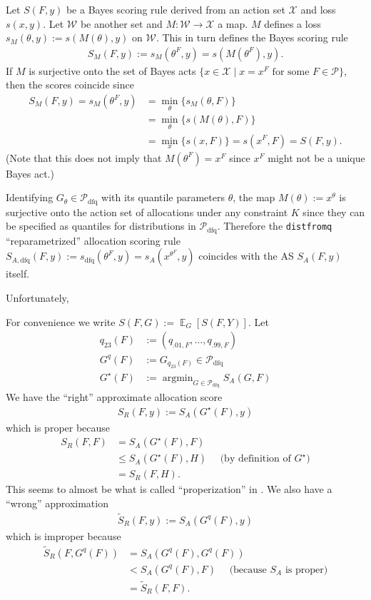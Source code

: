 \documentclass{article}
\DeclareMathOperator*{\argmin}{argmin}
\DeclareMathOperator{\Ex}{\mathbb{E}}
\begin{document}
Let $S(F,y)$ be a Bayes scoring rule derived from an action set $\mathcal{X}$ and loss $s(x,y)$.
Let $\mathcal{W}$ be another set and $M:\mathcal{W} \to \mathcal{X}$ a map. $M$ defines a loss $s_M(\theta, y):= s(M(\theta), y)$
on $\mathcal{W}$. This in turn defines the Bayes scoring rule
\begin{align}
S_M(F,y) := s_M(\theta^F,y) = s(M(\theta^F),y).
\end{align}
If $M$ is surjective onto the set of Bayes acts $\{x \in \mathcal{X} \mid x = x^F \text{ for some } F \in \mathcal{P}\}$, then the scores coincide since
\begin{align}
S_M(F,y) = s_M(\theta^F,y) & = \min_{\theta}\{s_M(\theta,F)\} \\
&= \min_{\theta}\{s(M(\theta),F)\}  \\
&= \min_{x}\{s(x,F)\} = s(x^F,F) = S(F,y).
\end{align}
(Note that this does not imply that $M(\theta^F) = x^F$ since $x^F$ might not be a unique Bayes act.)

Identifying $G_{\theta}\in \mathcal{P}_{\mathrm{dfq}}$ with its quantile parameters $\theta$, the map $M(\theta):= x^{\theta}$  
is surjective onto the action set of allocations under any constraint $K$ since they can be specified as quantiles for 
distributions in $\mathcal{P}_{\mathrm{dfq}}$.  Therefore
the \verb`distfromq` ``reparametrized'' allocation scoring rule 
$S_{A, \mathrm{dfq}}(F,y):= s_{\mathrm{dfq}}(\theta^F,y) = s_A(x^{\theta^F},y)$ coincides with the AS $S_A(F,y)$ itself.

Unfortunately, 





For convenience we write $S(F,G) := \Ex_G[S(F,Y)]$. Let
\begin{align*}
q_{23}(F) &:= (q_{.01,F},\ldots,q_{.99,F}) \\
G^q(F) &:= G_{q_{23}(F)} \in \mathcal{P}_{\mathrm{dfq}} \\
G^{\star}(F) &:= \argmin_{G \in \mathcal{P}_{\mathrm{dfq}}} S_A(G,F)
\end{align*}
We have the ``right'' approximate allocation score
\begin{align*}
S_{R}(F,y):= S_A(G^{\star}(F),y)
\end{align*}
which is proper because 
\begin{align*}
S_R(F,F) &= S_A(G^{\star}(F), F) \\ 
&\leq S_A(G^{\star}(F), H) \quad \text{ (by definition of $G^{\star}$)} \\
&=S_R(F,H).
\end{align*}
This seems to almost be what is called ``properization'' in \cite{brehmer2020properization}.
We also have a ``wrong'' approximation 
\begin{align*}
\tilde{S}_R(F,y) := S_A(G^q(F),y)
\end{align*}
which is improper because
\begin{align*}
\tilde{S}_R(F,G^q(F)) &= S_A(G^q(F),G^q(F)) \\
 &<  S_A(G^q(F),F) \quad \text{ (because $S_A$ is proper)} \\
 &= \tilde{S}_R(F,F).
\end{align*}






\end{document}
